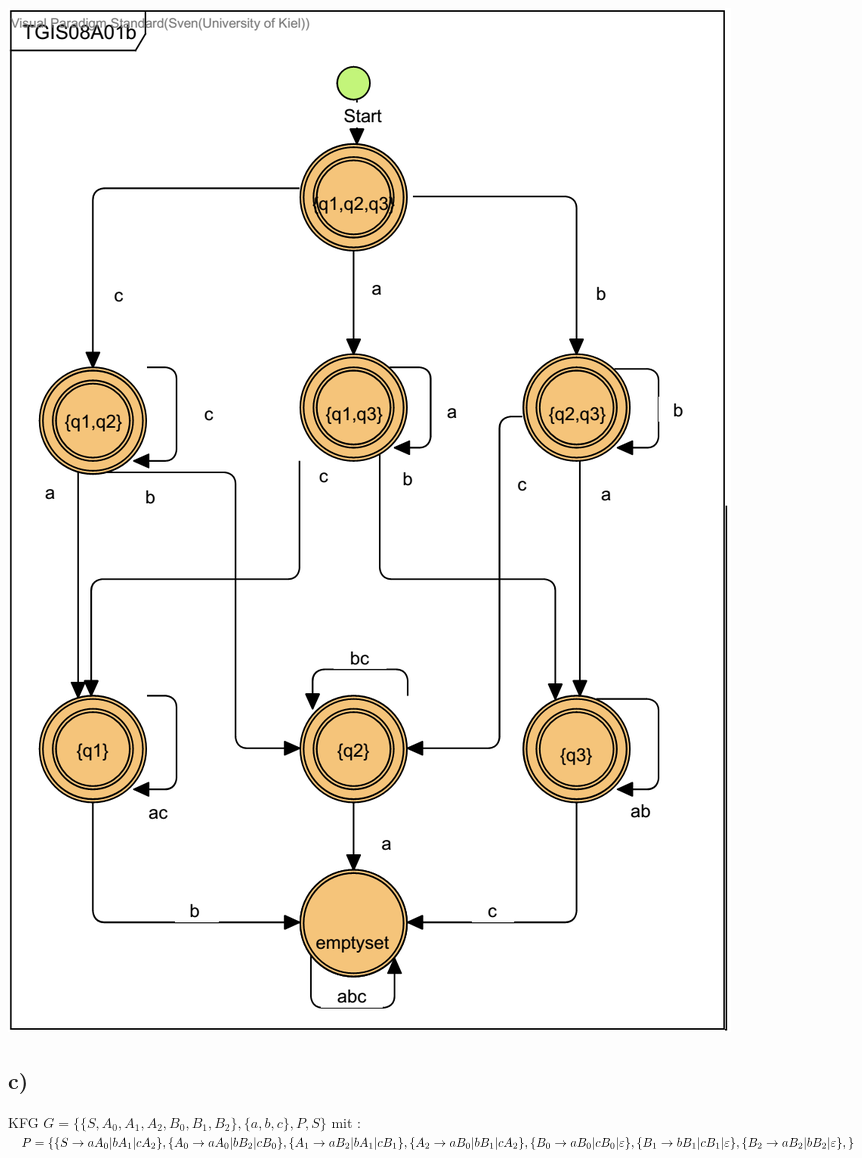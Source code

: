 \includegraphics[scale=0.9]{part/TGIS08A01b}


\subsection*{c)}

KFG $G = \{ \{S,A_0,A_1,A_2,B_0,B_1,B_2 \}, \{a,b,c \}, P, S \}$
mit : \\
$P = \{ \\
        \{S \rightarrow aA_0 | bA_1 | cA_2 \},\\
        \{A_0 \rightarrow aA_0 | bB_2 | cB_0 \},\\
        \{A_1 \rightarrow aB_2 | bA_1 | cB_1 \},\\
        \{A_2 \rightarrow aB_0 | bB_1 | cA_2 \},\\
        \{B_0 \rightarrow aB_0 | cB_0 | \varepsilon \},\\
        \{B_1 \rightarrow bB_1 | cB_1 | \varepsilon \},\\
        \{B_2 \rightarrow aB_2 | bB_2 | \varepsilon \},\\
          \} $